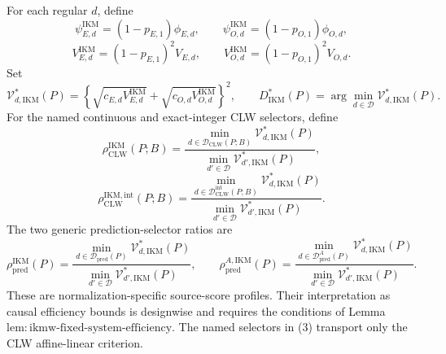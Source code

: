 For each regular \(d\), define
\[
 \psi_{E,d}^{\mathrm{IKM}}=(1-p_{E,1})\phi_{E,d},
 \qquad
 \psi_{O,d}^{\mathrm{IKM}}=(1-p_{O,1})\phi_{O,d},
\]
\[
 V_{E,d}^{\mathrm{IKM}}=(1-p_{E,1})^2V_{E,d},
 \qquad
 V_{O,d}^{\mathrm{IKM}}=(1-p_{O,1})^2V_{O,d}.               \tag{1}
\]
Set
\[
 \mathcal V_{d,\mathrm{IKM}}^*(P)=
 \left\{
 \sqrt{c_{E,d}V_{E,d}^{\mathrm{IKM}}}
 +\sqrt{c_{O,d}V_{O,d}^{\mathrm{IKM}}}
 \right\}^2,
 \qquad
 D_{\mathrm{IKM}}^*(P)=
 \arg\min_{d\in\mathcal D}\mathcal V_{d,\mathrm{IKM}}^*(P). \tag{2}
\]
For the named continuous and exact-integer CLW selectors, define
\[
 \rho_{\mathrm{CLW}}^{\mathrm{IKM}}(P;B)=
 \frac{\min_{d\in\mathcal D_{\mathrm{CLW}}(P;B)}
 \mathcal V_{d,\mathrm{IKM}}^*(P)}
 {\min_{d'\in\mathcal D}\mathcal V_{d',\mathrm{IKM}}^*(P)},
\]
\[
 \rho_{\mathrm{CLW}}^{\mathrm{IKM,int}}(P;B)=
 \frac{\min_{d\in\mathcal D_{\mathrm{CLW}}^{\mathrm{int}}(P;B)}
 \mathcal V_{d,\mathrm{IKM}}^*(P)}
 {\min_{d'\in\mathcal D}\mathcal V_{d',\mathrm{IKM}}^*(P)}. \tag{3}
\]
The two generic prediction-selector ratios are
\[
 \rho_{\mathrm{pred}}^{\mathrm{IKM}}(P)=
 \frac{\min_{d\in\mathcal D_{\mathrm{pred}}(P)}
 \mathcal V_{d,\mathrm{IKM}}^*(P)}
 {\min_{d'\in\mathcal D}\mathcal V_{d',\mathrm{IKM}}^*(P)},
 \qquad
 \rho_{\mathrm{pred}}^{A,\mathrm{IKM}}(P)=
 \frac{\min_{d\in\mathcal D_{\mathrm{pred}}^A(P)}
 \mathcal V_{d,\mathrm{IKM}}^*(P)}
 {\min_{d'\in\mathcal D}\mathcal V_{d',\mathrm{IKM}}^*(P)}. \tag{4}
\]
These are normalization-specific source-score profiles.  Their interpretation as causal efficiency bounds is designwise and requires the conditions of Lemma~\(\mathrm{lem{:}ikmw\text{-}fixed\text{-}system\text{-}efficiency}\).  The named selectors in (3) transport only the CLW affine-linear criterion.